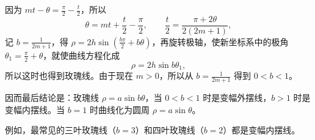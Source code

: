 因为 $mt-\theta=\frac{\pi}{2}-\frac{t}{2}$，所以
\[
  \theta=mt+\frac{t}{2}-\frac{\pi}{2},\qquad \frac{t}{2}=\frac{\pi+2\theta}{2(2m+1)},
\]
记 $b=\frac{1}{2m+1}$，得 $\rho=2h\sin\left(\frac{b\pi}{2}+b\theta\right)$，再旋转极轴，使新坐标系中的极角 $\theta_1=\frac{\pi}{2}+\theta$，就使曲线方程化成
\[
  \rho=2h\sin b\theta_1,
\]
所以这时也得到玫瑰线。由于现在 $m>0$，所以从 $b=\frac{1}{2m+1}$ 得到 $0<b<1$。

因而最后结论是：玫瑰线 $\rho=a\sin b\theta$，当 $0<b<1$ 时是变幅外摆线，$b>1$ 时是变幅内摆线。当 $b=1$ 时曲线化为圆周 $\rho=a\sin\theta$。

例如，最常见的三叶玫瑰线（$b=3$）和四叶玫瑰线（$b=2$）都是变幅内摆线。
